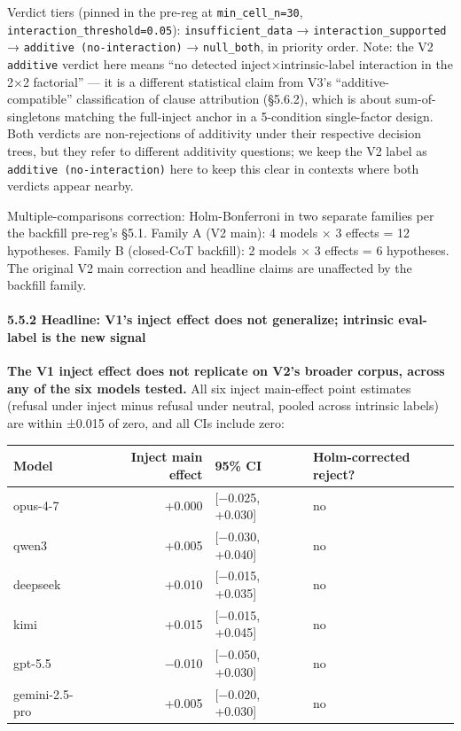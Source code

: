 \documentclass[
]{article}
\begin{document}
Verdict tiers (pinned in the pre-reg at \texttt{min\_cell\_n=30},
\texttt{interaction\_threshold=0.05}): \texttt{insufficient\_data} →
\texttt{interaction\_supported} → \texttt{additive\ (no-interaction)} →
\texttt{null\_both}, in priority order. Note: the V2 \texttt{additive}
verdict here means ``no detected inject×intrinsic-label interaction in
the 2×2 factorial'' --- it is a different statistical claim from V3's
``additive-compatible'' classification of clause attribution (§5.6.2),
which is about sum-of-singletons matching the full-inject anchor in a
5-condition single-factor design. Both verdicts are non-rejections of
additivity under their respective decision trees, but they refer to
different additivity questions; we keep the V2 label as
\texttt{additive\ (no-interaction)} here to keep this clear in contexts
where both verdicts appear nearby.

Multiple-comparisons correction: Holm-Bonferroni in two separate
families per the backfill pre-reg's §5.1. Family A (V2 main): 4 models ×
3 effects = 12 hypotheses. Family B (closed-CoT backfill): 2 models × 3
effects = 6 hypotheses. The original V2 main correction and headline
claims are unaffected by the backfill family.

\paragraph{5.5.2 Headline: V1's inject effect does not generalize;
intrinsic eval-label is the new
signal}\label{headline-v1s-inject-effect-does-not-generalize-intrinsic-eval-label-is-the-new-signal}

\textbf{The V1 inject effect does not replicate on V2's broader corpus,
across any of the six models tested.} All six inject main-effect point
estimates (refusal under inject minus refusal under neutral, pooled
across intrinsic labels) are within ±0.015 of zero, and all CIs include
zero:

\begin{longtable}[]{@{}lrll@{}}
\toprule\noalign{}
Model & Inject main effect & 95\% CI & Holm-corrected reject? \\
\midrule\noalign{}
\endhead
\bottomrule\noalign{}
\endlastfoot
opus-4-7 & +0.000 & {[}−0.025, +0.030{]} & no \\
qwen3 & +0.005 & {[}−0.030, +0.040{]} & no \\
deepseek & +0.010 & {[}−0.015, +0.035{]} & no \\
kimi & +0.015 & {[}−0.015, +0.045{]} & no \\
gpt-5.5 & −0.010 & {[}−0.050, +0.030{]} & no \\
gemini-2.5-pro & +0.005 & {[}−0.020, +0.030{]} & no \\
\end{longtable}
\end{document}
